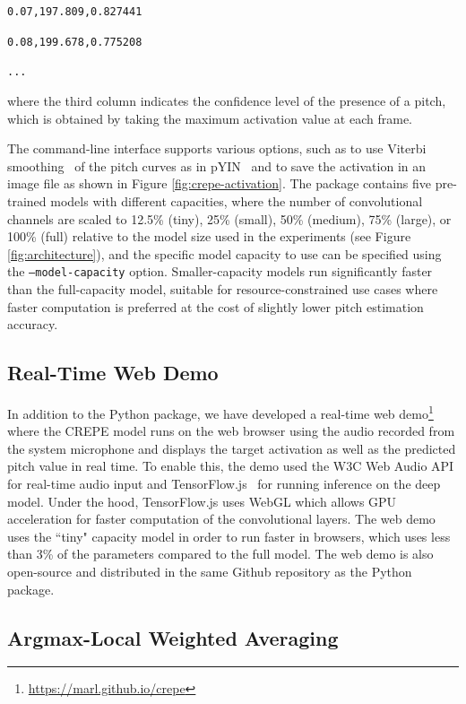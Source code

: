 \texttt{0.07,197.809,0.827441}

\texttt{0.08,199.678,0.775208}

\texttt{...}
\vspace{1em}

\noindent where the third column indicates the confidence level of the presence of a pitch, which is obtained by taking the maximum activation value at each frame.

The command-line interface supports various options, such as to use Viterbi smoothing~\cite{viterbi1967decoding} of the pitch curves as in pYIN~\cite{mauch2014pyin} and to save the activation in an image file as shown in Figure \ref{fig:crepe-activation}.
The package contains five pre-trained models with different capacities, where the number of convolutional channels are scaled to 12.5\% (tiny), 25\% (small), 50\% (medium), 75\% (large), or 100\% (full) relative to the model size used in the experiments (see Figure \ref{fig:architecture}), and the specific model capacity to use can be specified using the \texttt{--model-capacity} option.
Smaller-capacity models run significantly faster than the full-capacity model, suitable for resource-constrained use cases where faster computation is preferred at the cost of slightly lower pitch estimation accuracy.


\subsection{Real-Time Web Demo}

In addition to the Python package, we have developed a real-time web demo\footnote{\url{https://marl.github.io/crepe}} where the CREPE model runs on the web browser using the audio recorded from the system microphone and displays the target activation as well as the predicted pitch value in real time.
To enable this, the demo used the W3C Web Audio API for real-time audio input and TensorFlow.js~\cite{smilkov2019tensorflowjs} for running inference on the deep model.
Under the hood, TensorFlow.js uses WebGL which allows GPU acceleration for faster computation of the convolutional layers.
The web demo uses the ``tiny" capacity model in order to run faster in browsers, which uses less than 3\% of the parameters compared to the full model.
The web demo is also open-source and distributed in the same Github repository as the Python package.

\subsection{Argmax-Local Weighted Averaging}


